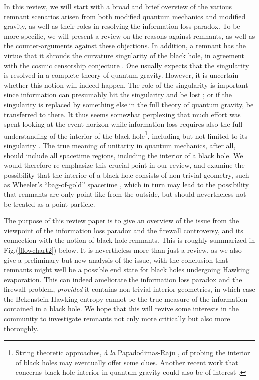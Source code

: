 \documentclass[12pt]{article}
\newcommand{\2}{$^2$}
\newcommand{\3}{$^3$}
\newcommand{\4}{$_4$}
\newcommand{\5}{$_5$}
\begin{document}
In this review, we will start with a broad and brief overview of the various remnant scenarios arisen from both modified quantum mechanics and modified gravity, as well as their roles
in resolving the information loss paradox.
To be more specific, we will present a review on the reasons against remnants, as well as the counter-arguments against these objections. In addition, a remnant has the virtue that it shrouds the curvature singularity of the black hole, in agreement with the cosmic censorship conjecture \cite{penrose}. One usually expects that the singularity is resolved in a complete theory of quantum gravity. However, it is uncertain whether this notion will indeed happen.
The role of the singularity is important since information can presumably hit the singularity and be lost \cite{Wald1, HP, ellis}; or if the singularity is replaced by something else in the full theory of quantum gravity, be transferred to there. It thus seems somewhat perplexing that much effort was spent looking at the event horizon while information loss requires also the full understanding of the interior of the black hole\footnote{String theoretic approaches, \emph{\`a la} Papadodimas-Raju \cite{raju1, raju2, raju3, monica}, of probing the interior of black holes may eventually offer some clues. Another recent work that concerns black hole interior in quantum gravity could also be of interest \cite{1412.7539}.}, including but not limited to its singularity \cite{sabine}. The true meaning of unitarity in quantum mechanics, after all, should include all spacetime regions, including the interior of a black hole.
We would therefore re-emphasize this crucial point in our review, and examine the possibility that the interior of a black hole consists of non-trivial geometry, such as Wheeler's ``bag-of-gold'' spacetime \cite{wheeler}, which in turn may lead to the possibility that remnants are only point-like from the outside, but should nevertheless not be treated as a point particle.   

The purpose of this review paper is to give an overview of the issue from the viewpoint of the information loss paradox and the firewall controversy, and its connection with the notion of black hole remnants. This is roughly summarized in Fig.(\ref{flowchart2}) below.
It is nevertheless more than just a review, as we also give a preliminary but new analysis of the issue, with the conclusion that remnants might well be a possible end state for black holes undergoing Hawking evaporation. This
can indeed ameliorate the information loss paradox and the firewall problem, \emph{provided} it contains non-trivial interior geometries, in which case the Bekenstein-Hawking entropy cannot be the true measure of the information contained in a black hole. 
We hope that this will revive some interests in the community to investigate remnants not only more critically but also more thoroughly. 
\end{document}

